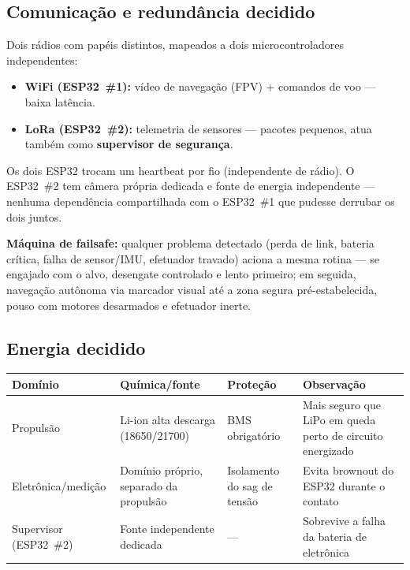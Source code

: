 \documentclass[11pt,a4paper]{article}
\newcommand{\statusok}{\textcolor{voltok}{\textbf{decidido}}}
\begin{document}
\subsection{Comunicação e redundância \normalfont\statusok}

Dois rádios com papéis distintos, mapeados a dois microcontroladores independentes:

\begin{itemize}[itemsep=2pt]
  \item \textbf{WiFi (ESP32~\#1):} vídeo de navegação (FPV) + comandos de voo — baixa latência.
  \item \textbf{LoRa (ESP32~\#2):} telemetria de sensores — pacotes pequenos, atua também como \textbf{supervisor de segurança}.
\end{itemize}

Os dois ESP32 trocam um heartbeat por fio (independente de rádio). O ESP32~\#2 tem câmera própria dedicada e fonte de energia independente — nenhuma dependência compartilhada com o ESP32~\#1 que pudesse derrubar os dois juntos.

\textbf{Máquina de failsafe:} qualquer problema detectado (perda de link, bateria crítica, falha de sensor/IMU, efetuador travado) aciona a mesma rotina — se engajado com o alvo, desengate controlado e lento primeiro; em seguida, navegação autônoma via marcador visual até a zona segura pré-estabelecida, pouso com motores desarmados e efetuador inerte.

\subsection{Energia \normalfont\statusok}

\begin{longtable}{@{}p{3cm}p{4.3cm}p{3cm}p{5cm}@{}}
\toprule
\textbf{Domínio} & \textbf{Química/fonte} & \textbf{Proteção} & \textbf{Observação} \\
\midrule
\endhead
\bottomrule
\endfoot
Propulsão & Li-ion alta descarga (18650/21700) & BMS obrigatório & Mais seguro que LiPo em queda perto de circuito energizado \\
Eletrônica/medição & Domínio próprio, separado da propulsão & Isolamento do sag de tensão & Evita brownout do ESP32 durante o contato \\
Supervisor (ESP32~\#2) & Fonte independente dedicada & — & Sobrevive a falha da bateria de eletrônica \\
\end{longtable}
\end{document}
